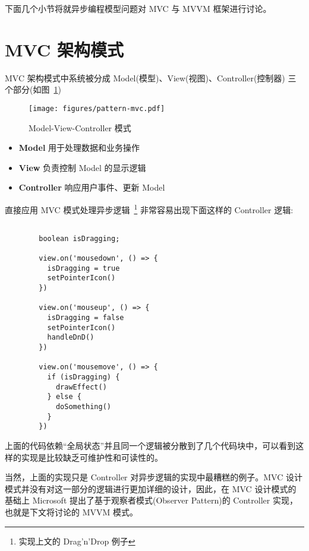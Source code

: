 下面几个小节将就异步编程模型问题对 MVC 与 MVVM 框架进行讨论。

\section{MVC 架构模式}

MVC 架构模式中系统被分成 Model(模型)、View(视图)、Controller(控制器) 三个部分(如图~\ref{PatternMVC})

\begin{figure}[!h]
  \begin{center}
    \texttt{[image: figures/pattern-mvc.pdf]}
    \caption{Model-View-Controller 模式\label{PatternMVC}}
  \end{center}
\end{figure}

\begin{itemize}
  \item \textbf{Model} 用于处理数据和业务操作
  \item \textbf{View} 负责控制 Model 的显示逻辑
  \item \textbf{Controller} 响应用户事件、更新 Model
\end{itemize}

直接应用 MVC 模式处理异步逻辑~\footnote{实现上文的 Drag'n'Drop 例子} 非常容易出现下面这样的 Controller 逻辑:

\begin{verbatim}

        boolean isDragging;

        view.on('mousedown', () => {
          isDragging = true
          setPointerIcon()
        })

        view.on('mouseup', () => {
          isDragging = false
          setPointerIcon()
          handleDnD()
        })

        view.on('mousemove', () => {
          if (isDragging) {
            drawEffect()
          } else {
            doSomething()
          }
        })

\end{verbatim}

上面的代码依赖“全局状态”并且同一个逻辑被分散到了几个代码块中，可以看到这样的实现是比较缺乏可维护性和可读性的。

当然，上面的实现只是 Controller 对异步逻辑的实现中最糟糕的例子。MVC 设计模式并没有对这一部分的逻辑进行更加详细的设计，因此，在 MVC 设计模式的基础上 Microsoft 提出了基于观察者模式(Observer Pattern)的 Controller 实现，也就是下文将讨论的 MVVM 模式。

